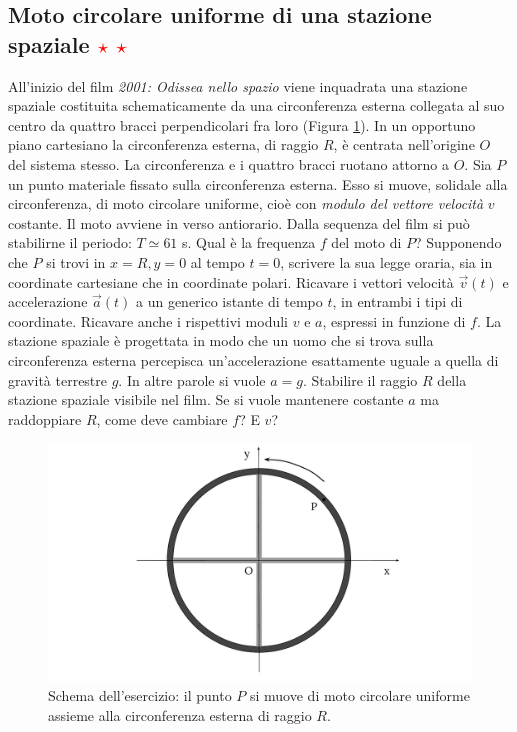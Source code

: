 \documentclass[12pt,a4paper]{book}
\newcommand{\rstar}{ \textcolor{red}{$\star$}}
\begin{document}
\subsection{Moto circolare uniforme di una stazione spaziale \rstar\rstar} 
All'inizio del film \textit{2001: Odissea nello spazio} viene inquadrata una stazione spaziale costituita schematicamente da una circonferenza esterna collegata al suo centro da quattro bracci perpendicolari fra loro (Figura \ref{fig:ruota1}). In un opportuno piano cartesiano la circonferenza esterna, di raggio $R$, è centrata nell'origine $O$ del sistema stesso. La circonferenza e i quattro bracci ruotano attorno a $O$. Sia $P$ un punto materiale fissato sulla circonferenza esterna. Esso si muove, solidale alla circonferenza, di moto circolare uniforme, cioè con \textit{modulo del vettore velocità} $v$ costante. Il moto avviene in verso antiorario. Dalla sequenza del film si può stabilirne il periodo: $T\simeq 61$ s. Qual è la frequenza $f$ del moto di $P$? Supponendo che $P$ si trovi in $x=R, y=0$  al tempo $t=0$, scrivere la sua legge oraria, sia in coordinate cartesiane che in coordinate polari.  Ricavare i vettori velocità $\vec{v}(t)$ e accelerazione $\vec{a}(t)$ a un generico istante di tempo $t$, in entrambi i tipi di coordinate.  Ricavare anche i rispettivi moduli  $v$ e $a$, espressi in funzione di $f$. La stazione spaziale è progettata in modo che un uomo che si trova sulla circonferenza esterna percepisca un'accelerazione esattamente uguale a quella di gravità terrestre $g$. In altre parole si vuole $a=g$. Stabilire il raggio $R$ della stazione spaziale visibile nel film. Se si vuole mantenere costante $a$ ma raddoppiare $R$, come deve cambiare $f$? E $v$?

 \begin{figure}[!ht]
 \centering
\includegraphics[scale=0.45]{ruota1.pdf}
\caption{Schema dell'esercizio: il punto $P$ si muove di moto circolare uniforme assieme alla circonferenza esterna di raggio $R$. \label{fig:ruota1} }
\end{figure}
\end{document}
